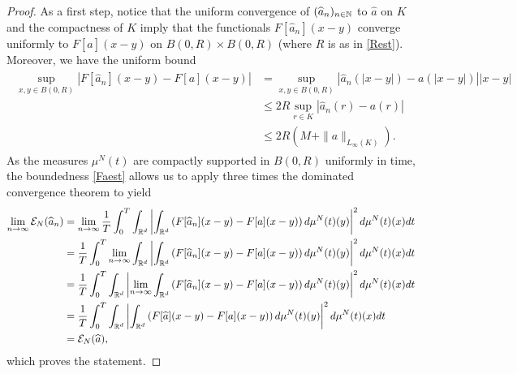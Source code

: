 \begin{proof}
As a first step, notice that the uniform convergence of $(\widehat a_n)_{n \in \mathbb{N}}$ to $\widehat a$ on $K$ and the compactness of $K$ imply that the functionals $F[\widehat a_n](x-y)$ converge uniformly to $F[\widehat a](x-y)$ on $B(0,R)\times B(0,R)$ (where $R$ is as in \eqref{Rest}). Moreover, we have the uniform bound
\begin{align}
\begin{split}\label{Faest}
\sup_{x,y\in B(0,R)}|F[\widehat a_n](x-y) - F[a](x-y)| &= \sup_{x,y\in B(0,R)}|\widehat a_n(|x-y|) -  a(|x-y|)| |x-y| \\
&\leq 2R \sup_{r\in K} |\widehat a_n(r) -  a(r)| \\
& \leq 2R(M + \|a\|_{L_{\infty}(K)}).
\end{split}
\end{align}
As the measures $\mu^N(t)$ are compactly supported in $B(0,R)$ uniformly in time, the boundedness \eqref{Faest} allows us to apply three times the dominated convergence theorem to yield
\begin{align*}
\lim_{n \rightarrow \infty} \mathcal E_N(\widehat a_n) &= \lim_{n \rightarrow \infty}\frac{1}{T}\int_0^T\int_{\mathbb{R}^d} \left| \int_{\mathbb{R}^d}
			\left(F[\widehat a_n](x-y)-F[a](x-y)\right)d\mu^N(t)(y)\right|^2d\mu^N(t)(x) dt\\
			&= \frac{1}{T}\int_0^T\lim_{n \rightarrow \infty}\int_{\mathbb{R}^d} \left| \int_{\mathbb{R}^d}
			\left(F[\widehat a_n](x-y)-F[a](x-y)\right)d\mu^N(t)(y)\right|^2 d\mu^N(t)(x) dt\\
			&= \frac{1}{T}\int_0^T\int_{\mathbb{R}^d} \left| \lim_{n \rightarrow \infty}\int_{\mathbb{R}^d}
			\left(F[\widehat a_n](x-y)-F[a](x-y)\right)d\mu^N(t)(y)\right|^2 d\mu^N(t)(x) dt\\
			&= \frac{1}{T}\int_0^T\int_{\mathbb{R}^d} \left| \int_{\mathbb{R}^d}
			\left(F[\widehat a](x-y)-F[a](x-y)\right)d\mu^N(t)(y)\right|^2 d\mu^N(t)(x) dt\\
&=  \mathcal E_N(\widehat a),
\end{align*}
which proves the statement.


\end{proof}
